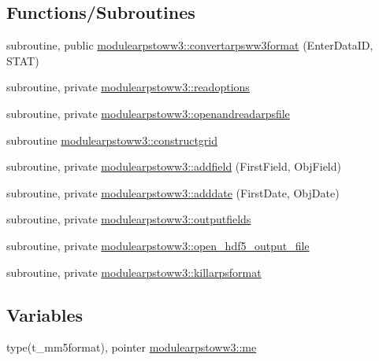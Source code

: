 \subsection*{Functions/\+Subroutines}
\begin{DoxyCompactItemize}
\item 
subroutine, public \mbox{\hyperlink{namespacemodulearpstoww3_a42304b111881f48406d8d939918e21ef}{modulearpstoww3\+::convertarpsww3format}} (Enter\+Data\+ID, S\+T\+AT)
\item 
subroutine, private \mbox{\hyperlink{namespacemodulearpstoww3_a7642538ceff4533a4ad2aeba84fb2d32}{modulearpstoww3\+::readoptions}}
\item 
subroutine, private \mbox{\hyperlink{namespacemodulearpstoww3_aa5a12099f3353b33d3b40f8f3f4384f0}{modulearpstoww3\+::openandreadarpsfile}}
\item 
subroutine \mbox{\hyperlink{namespacemodulearpstoww3_a509b1aea6540dc5784cfe7424f0e6414}{modulearpstoww3\+::constructgrid}}
\item 
subroutine, private \mbox{\hyperlink{namespacemodulearpstoww3_a0277d24244051759af2fcc3106ef5a08}{modulearpstoww3\+::addfield}} (First\+Field, Obj\+Field)
\item 
subroutine, private \mbox{\hyperlink{namespacemodulearpstoww3_a81436aea40d31bddb32f553e227a991d}{modulearpstoww3\+::adddate}} (First\+Date, Obj\+Date)
\item 
subroutine, private \mbox{\hyperlink{namespacemodulearpstoww3_a7c18511d187912f655458191bcf1c7af}{modulearpstoww3\+::outputfields}}
\item 
subroutine, private \mbox{\hyperlink{namespacemodulearpstoww3_a7a7eb9b823582e046e2127ea46d3f300}{modulearpstoww3\+::open\+\_\+hdf5\+\_\+output\+\_\+file}}
\item 
subroutine, private \mbox{\hyperlink{namespacemodulearpstoww3_a2b22a4f72b20cf6f219d61b511afcad1}{modulearpstoww3\+::killarpsformat}}
\end{DoxyCompactItemize}
\subsection*{Variables}
\begin{DoxyCompactItemize}
\item 
type(t\+\_\+mm5format), pointer \mbox{\hyperlink{namespacemodulearpstoww3_ae048aea87bb0343812cdb60ee1a1f6b8}{modulearpstoww3\+::me}}
\end{DoxyCompactItemize}
